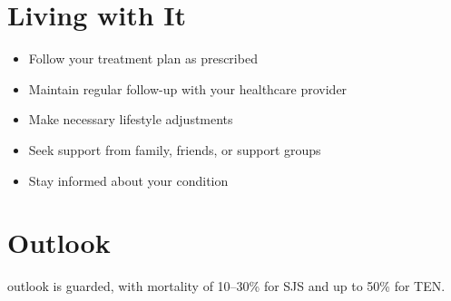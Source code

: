\section{Living with It}
\begin{itemize}[noitemsep]
  \item Follow your treatment plan as prescribed
  \item Maintain regular follow-up with your healthcare provider
  \item Make necessary lifestyle adjustments
  \item Seek support from family, friends, or support groups
  \item Stay informed about your condition
\end{itemize}
\section{Outlook}
outlook is guarded, with mortality of 10--30\% for SJS and up to 50\% for TEN.
